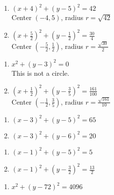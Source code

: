 \begin{multicols}{2}
\begin{enumerate}
\setcounter{enumi}{\value{HW}}

\item $(x+4)^2 + (y-5)^2 = 42$ \\
Center $(-4,5)$, radius $r = \sqrt{42}$

\item $\left(x + \frac{5}{2}\right)^2 + \left(y - \frac{1}{2}\right)^2 = \frac{30}{4}$ \\
Center $\left( -\frac{5}{2}, \frac{1}{2}\right)$, radius $r = \frac{\sqrt{30}}{2}$

\setcounter{HW}{\value{enumi}}
\end{enumerate}
\end{multicols}

\begin{multicols}{2}
\begin{enumerate}
\setcounter{enumi}{\value{HW}}

\item $x^{2} + (y - 3)^{2} = 0$\\
This is not a circle.

\item $\left(x + \frac{1}{2}\right)^{2} + \left(y - \frac{3}{5}\right)^{2} = \frac{161}{100}$\\
Center $\left(-\frac{1}{2}, \frac{3}{5}\right)$, radius $r = \frac{\sqrt{161}}{10}$


\setcounter{HW}{\value{enumi}}
\end{enumerate}
\end{multicols}

\begin{multicols}{2}
\begin{enumerate}
\setcounter{enumi}{\value{HW}}

\item $(x - 3)^{2} + (y - 5)^{2} = 65$

\item  $(x-3)^2+(y-6)^2 = 20$

\setcounter{HW}{\value{enumi}}
\end{enumerate}
\end{multicols}

\begin{multicols}{2}
\begin{enumerate}
\setcounter{enumi}{\value{HW}}

\item  $(x-1)^2 + (y-5)^2 = 5$

\item $(x-1)^2 + \left(y - \frac{3}{2}\right)^2 = \frac{13}{2}$

\setcounter{HW}{\value{enumi}}
\end{enumerate}
\end{multicols}

\begin{enumerate}
\setcounter{enumi}{\value{HW}}

\item $x^{2} + (y - 72)^{2} = 4096$

\end{enumerate}

\closegraphsfile
